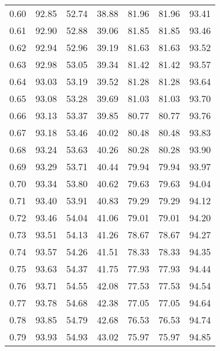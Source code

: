 \begin{tabular}{|c|c|c|c|c|c|c|}
      0.60 &     92.85 &     52.74 &      38.88 &   81.96 &      81.96 &         93.41 \\
      0.61 &     92.90 &     52.88 &      39.06 &   81.85 &      81.85 &         93.46 \\
      0.62 &     92.94 &     52.96 &      39.19 &   81.63 &      81.63 &         93.52 \\
      0.63 &     92.98 &     53.05 &      39.34 &   81.42 &      81.42 &         93.57 \\
      0.64 &     93.03 &     53.19 &      39.52 &   81.28 &      81.28 &         93.64 \\
      0.65 &     93.08 &     53.28 &      39.69 &   81.03 &      81.03 &         93.70 \\
      0.66 &     93.13 &     53.37 &      39.85 &   80.77 &      80.77 &         93.76 \\
      0.67 &     93.18 &     53.46 &      40.02 &   80.48 &      80.48 &         93.83 \\
      0.68 &     93.24 &     53.63 &      40.26 &   80.28 &      80.28 &         93.90 \\
      0.69 &     93.29 &     53.71 &      40.44 &   79.94 &      79.94 &         93.97 \\
      0.70 &     93.34 &     53.80 &      40.62 &   79.63 &      79.63 &         94.04 \\
      0.71 &     93.40 &     53.91 &      40.83 &   79.29 &      79.29 &         94.12 \\
      0.72 &     93.46 &     54.04 &      41.06 &   79.01 &      79.01 &         94.20 \\
      0.73 &     93.51 &     54.13 &      41.26 &   78.67 &      78.67 &         94.27 \\
      0.74 &     93.57 &     54.26 &      41.51 &   78.33 &      78.33 &         94.35 \\
      0.75 &     93.63 &     54.37 &      41.75 &   77.93 &      77.93 &         94.44 \\
      0.76 &     93.71 &     54.55 &      42.08 &   77.53 &      77.53 &         94.54 \\
      0.77 &     93.78 &     54.68 &      42.38 &   77.05 &      77.05 &         94.64 \\
      0.78 &     93.85 &     54.79 &      42.68 &   76.53 &      76.53 &         94.74 \\
      0.79 &     93.93 &     54.93 &      43.02 &   75.97 &      75.97 &         94.85 \\

\end{tabular}
